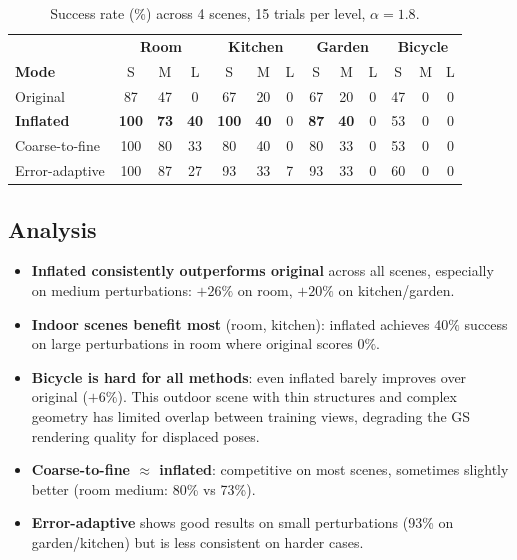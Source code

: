 \documentclass[11pt]{article}
\begin{document}
\begin{table}[h!]
\centering
\caption{Success rate (\%) across 4 scenes, 15 trials per level, $\alpha = 1.8$.}
\label{tab:multi_scene}
\begin{tabular}{l|ccc|ccc|ccc|ccc}
\toprule
& \multicolumn{3}{c|}{\textbf{Room}} & \multicolumn{3}{c|}{\textbf{Kitchen}} & \multicolumn{3}{c|}{\textbf{Garden}} & \multicolumn{3}{c}{\textbf{Bicycle}} \\
\textbf{Mode} & S & M & L & S & M & L & S & M & L & S & M & L \\
\midrule
Original       & 87 & 47 & 0  & 67 & 20 & 0 & 67 & 20 & 0 & 47 & 0 & 0 \\
\textbf{Inflated}       & \textbf{100} & \textbf{73} & \textbf{40} & \textbf{100} & \textbf{40} & 0 & \textbf{87} & \textbf{40} & 0 & 53 & 0 & 0 \\
Coarse-to-fine & 100 & 80 & 33 & 80 & 40 & 0 & 80 & 33 & 0 & 53 & 0 & 0 \\
Error-adaptive & 100 & 87 & 27 & 93 & 33 & 7 & 93 & 33 & 0 & 60 & 0 & 0 \\
\bottomrule
\end{tabular}
\end{table}

\subsection{Analysis}

\begin{itemize}
    \item \textbf{Inflated consistently outperforms original} across all scenes, especially on medium perturbations: $+26\%$ on room, $+20\%$ on kitchen/garden.
    \item \textbf{Indoor scenes benefit most} (room, kitchen): inflated achieves $40\%$ success on large perturbations in room where original scores $0\%$.
    \item \textbf{Bicycle is hard for all methods}: even inflated barely improves over original ($+6\%$). This outdoor scene with thin structures and complex geometry has limited overlap between training views, degrading the GS rendering quality for displaced poses.
    \item \textbf{Coarse-to-fine $\approx$ inflated}: competitive on most scenes, sometimes slightly better (room medium: 80\% vs 73\%).
    \item \textbf{Error-adaptive} shows good results on small perturbations (93\% on garden/kitchen) but is less consistent on harder cases.
\end{itemize}
\end{document}

